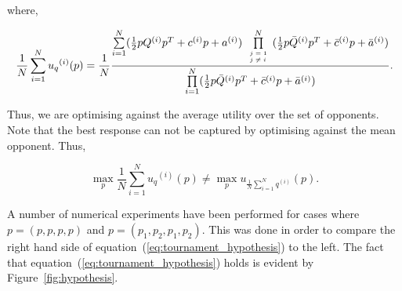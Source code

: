 \documentclass[10pt]{article}
\begin{document}
where,

\begin{equation}\label{eq:tournament_utility}
    \frac{1}{N} \sum\limits_{i=1} ^ {N} {u_q}^{(i)} (p) = \frac{1}{N}
    \frac{\sum\limits_{i=1} ^ {N} (\frac{1}{2} pQ^{(i)} p^T + c^{(i)} p + a^ {(i)})
    \prod\limits_{\tiny\begin{array}{l} j=1 \\ j \neq i \end{array}} ^ 
    N (\frac{1}{2} p\bar{Q}^{(i)} p^T + \bar{c}^{(i)} p + \bar{a}^ {(i)})}
    {\prod\limits_{i=1} ^ N (\frac{1}{2} p\bar{Q}^{(i)} p^T + \bar{c}^{(i)} p + \bar{a}^ {(i)})}.
\end{equation}

Thus, we are optimising against the average utility over the set of opponents.
Note that the best response can not be captured by optimising against the mean
opponent. Thus, 

\begin{equation}\label{eq:tournament_hypothesis}
    \max_p \frac{1}{N} \sum_{i=1} ^ {N} {u_q}^{(i)} (p) \neq \max_p
      u_{\frac {1}{N} \sum\limits_{i=1} ^ N q^{(i)}}(p).
\end{equation}

A number of numerical experiments have been performed for cases where \(p=(p, p, p, p)\)
and \(p= (p_1, p_2, p_1, p_2)\). This was done in order to compare the right hand
side of equation~(\ref{eq:tournament_hypothesis}) to the left. The fact that
equation~(\ref{eq:tournament_hypothesis}) holds is evident by Figure~\ref{fig:hypothesis}.
\end{document}
